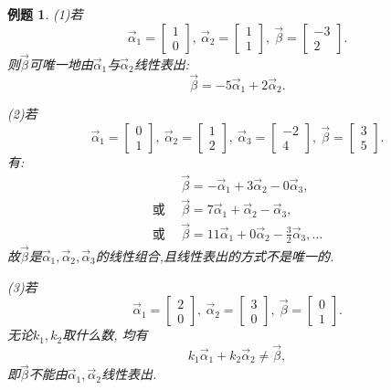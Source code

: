 \documentclass[a4paper]{book}
\newtheorem{eg}{例题}[chapter]
\begin{document}
\begin{eg}
(1)若$$\vec{\alpha}_1=\begin{bmatrix}1\\0\end{bmatrix},\ \vec{\alpha}_2=\begin{bmatrix}1\\1\end{bmatrix},\ \vec{\beta}=\begin{bmatrix}-3\\2\end{bmatrix}.$$
则$\vec{\beta}$可唯一地由$\vec{\alpha}_1$与$\vec{\alpha}_2$线性表出:$$\vec{\beta}=-5\vec{\alpha}_1+2\vec{\alpha}_2.$$

(2)若$$\vec{\alpha}_1=\begin{bmatrix}0\\1\end{bmatrix},\ \vec{\alpha}_2=\begin{bmatrix}1\\2\end{bmatrix},\
\vec{\alpha}_3=\begin{bmatrix}-2\\4\end{bmatrix},\
\vec{\beta}=\begin{bmatrix}3\\5\end{bmatrix}.$$
有:
\begin{displaymath}\begin{aligned}
&\vec{\beta}=-\vec{\alpha}_1+3\vec{\alpha}_2-0\vec{\alpha}_3,\\
\mbox{或}\ \ &\vec{\beta}=7\vec{\alpha}_1+\vec{\alpha}_2-\vec{\alpha}_3,\\
\mbox{或}\ \ &\vec{\beta}=11\vec{\alpha}_1+0\vec{\alpha}_2-\frac{3}{2}\vec{\alpha}_3,\dots
\end{aligned}\end{displaymath}
故$\vec{\beta}$是$\vec{\alpha}_1,\vec{\alpha}_2,\vec{\alpha}_3$的线性组合,且线性表出的方式不是唯一的.

(3)若$$\vec{\alpha}_1=\begin{bmatrix}2\\0\end{bmatrix},\ \vec{\alpha}_2=\begin{bmatrix}3\\0\end{bmatrix},\ \vec{\beta}=\begin{bmatrix}0\\1\end{bmatrix}.$$
无论$k_1,k_2$取什么数, 均有$$k_1\vec{\alpha}_1+k_2\vec{\alpha}_2\not=\vec{\beta},$$
即$\vec{\beta}$不能由$\vec{\alpha}_1,\vec{\alpha}_2$线性表出.

\end{eg}
\end{document}

